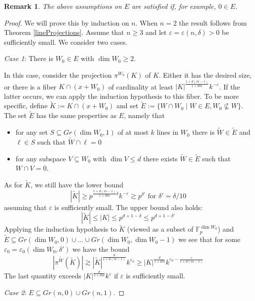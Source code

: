 \documentclass{amsart}
\newtheorem{remark}[theorem]{Remark}
\newcommand{\F}{\mathbb F}
\begin{document}
\begin{remark}
    The above assumptions on $E$ are satisfied if, for example, $0 \in E$.
\end{remark}
\begin{proof}
    We will prove this by induction on $n$. When $n = 2$ the result follows from Theorem \ref{lineProjections}. Assume that $n \geq 3$ and let $\varepsilon  = \varepsilon(n, \delta)> 0$ be sufficiently small. We consider two cases.

    \textit{Case 1}: There is $W_0 \in E$ with $\dim W_0 \geq 2$. 

    In this case, consider the projection $\pi^{W_0}(K)$ of $K$. Either it has the desired size, or there is a fiber $K \cap (x + W_0)$ of cardinality at least $|K|^\frac{1 + d(m - 1)}{1 + dm}k^{-\varepsilon}$. If the latter occurs, we can apply the induction hypothesis to this fiber. To be more specific, define $\tilde{K} := K \cap (x + W_0)$ and set $\tilde{E}:= \{W \cap W_0 \mid W \in E, W_0 \not \subseteq W\}$. The set $\tilde{E}$ has the same properties as $E$, namely that 
    \begin{itemize}
        \item for any set $S \subseteq Gr(\dim W_0, 1)$ of at most $k$ lines in $W_0$ there is $\tilde{W} \in \tilde{E}$ and $\ell \in S$ such that $\tilde{W} \cap \ell = 0$
        \item for any subspace $V \subseteq W_0$ with $\dim V \leq d$ there exists $\tilde{W} \in \tilde{E}$ such that $W \cap V = 0$.
    \end{itemize}
    As for $\tilde{K}$, we still have the lower bound $$|\tilde{K}| \geq p^{\frac{1 + d(m - 1)}{1 + dm}\delta} k^{-\varepsilon} \gtrsim p^{\delta'} \text{ for } \delta'= \delta/10$$ assuming that $\varepsilon$ is sufficiently small. The upper bound also holds: 
    $$|\tilde{K}| \leq |K| \leq p^{d + 1 - \delta} \leq p^{d + 1 - \delta'}$$
    Applying the induction hypothesis to $\tilde{K}$ (viewed as a subset of $\F_p^{\dim W_0}$) and $\tilde{E} \subseteq Gr(\dim W_0,0) \cup \ldots \cup Gr(\dim W_0, \dim W_0 - 1)$ we see that for some $\varepsilon_0 = \varepsilon_0(\dim W_0, \delta')$ we have the bound 
    $$|\pi^{\tilde{W}}(\tilde{K})| \gtrsim |\tilde{K}|^\frac{d}{1 + d(m - 1)}k^{\varepsilon_0} \geq |K|^\frac{d}{1 + dm} k^{\varepsilon_0 - \frac{\varepsilon}{1 + d(m - 1)}}$$
    The last quantity exceeds $|K|^\frac{d}{1 + dm}k^\varepsilon$ if $\varepsilon$ is sufficiently small. 

    \textit{Case 2}: $E \subseteq Gr(n, 0) \cup Gr(n, 1)$. 


\end{proof}
\end{document}
